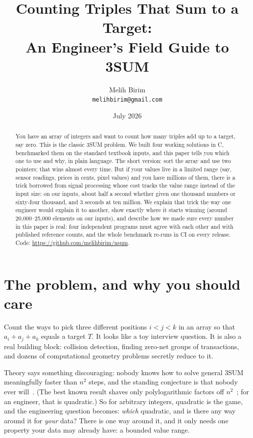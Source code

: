 \documentclass[11pt]{article}
\title{Counting Triples That Sum to a Target:\\An Engineer's Field Guide to 3SUM}
\author{Melih Birim\\\texttt{melihbirim@gmail.com}}
\date{July 2026}
\begin{document}
\maketitle

\begin{abstract}
You have an array of integers and want to count how many triples add up to a
target, say zero. This is the classic 3SUM problem. We built four working
solutions in C, benchmarked them on the standard textbook inputs, and this paper
tells you which one to use and why, in plain language. The short version: sort the
array and use two pointers; that wins almost every time. But if your values live
in a limited range (say, sensor readings, prices in cents, pixel values) and you
have millions of them, there is a trick borrowed from signal processing whose
cost tracks the value range instead of the input size: on our inputs, about half
a second whether given one thousand numbers or sixty-four thousand, and 3 seconds
at ten million. We explain that trick the way one engineer would explain it to another,
show exactly where it starts winning (around 20{,}000--25{,}000 elements on our
inputs), and describe how we made sure every number in this paper is real: four
independent programs must agree with each other and with published reference
counts, and the whole benchmark re-runs in CI on every release. Code:
\url{https://github.com/melihbirim/nsum}.
\end{abstract}

\section{The problem, and why you should care}

Count the ways to pick three different positions $i<j<k$ in an array so that
$a_i+a_j+a_k$ equals a target $T$. It looks like a toy interview question. It is
also a real building block: collision detection, finding zero-net groups of
transactions, and dozens of computational geometry problems secretly reduce to it.

Theory says something discouraging: nobody knows how to solve general 3SUM
meaningfully faster than $n^2$ steps, and the standing conjecture is that nobody
ever will~\cite{gajentaan1995}. (The best known result shaves only
polylogarithmic factors off $n^2$~\cite{gronlund2014}; for an engineer, that is
quadratic.) So for arbitrary integers, quadratic is the game, and the engineering
question becomes: \emph{which} quadratic, and is there any way around it for
\emph{your} data? There is one way around it, and it only needs one property your
data may already have: a bounded value range.
\end{document}
